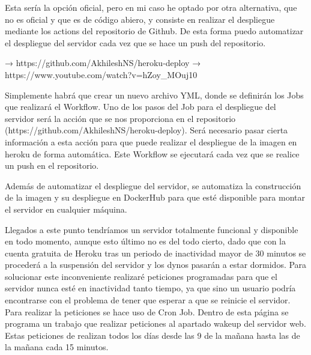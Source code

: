 Esta sería la opción oficial, pero en mi caso he optado por otra alternativa, que no es oficial y que es de código abiero, y consiste en realizar el despliegue mediante los actions del repositorio de Github. De esta forma puedo automatizar el despliegue del servidor cada vez que se hace un push del repositorio.

→ https://github.com/AkhileshNS/heroku-deploy
→ https://www.youtube.com/watch?v=hZoy_MOuj10

Simplemente habrá que crear un nuevo archivo YML, donde se definirán los Jobs que realizará el Workflow. Uno de los pasos del Job para el despliegue del servidor será la acción que se nos proporciona en el repositorio (https://github.com/AkhileshNS/heroku-deploy). Será necesario pasar cierta información a esta acción para que puede realizar el despliegue de la imagen en heroku de forma automática. Este Workflow se ejecutará cada vez que se realice un push en el repositorio.


Además de automatizar el despliegue del servidor, se automatiza la construcción de la imagen y su despliegue en DockerHub para que esté disponible para montar el servidor en cualquier máquina. 


Llegados a este punto tendríamos un servidor totalmente funcional y disponible en todo momento, aunque esto último no es del todo cierto, dado que con la cuenta gratuita de Heroku tras un periodo de inactividad mayor de 30 minutos se procederá a la suspensión del servidor y los dynos pasarán a estar dormidos. Para solucionar este inconveniente realizaré peticiones programadas para que el servidor nunca esté en inactividad tanto tiempo, ya que sino un usuario podría encontrarse con el problema de tener que esperar a que se reinicie el servidor. Para realizar la peticiones se hace uso de Cron Job. Dentro de esta página se programa un trabajo que realizar peticiones al apartado wakeup del servidor web. Estas peticiones de realizan todos los días desde las 9 de la mañana hasta las  de la mañana cada 15 minutos.














































